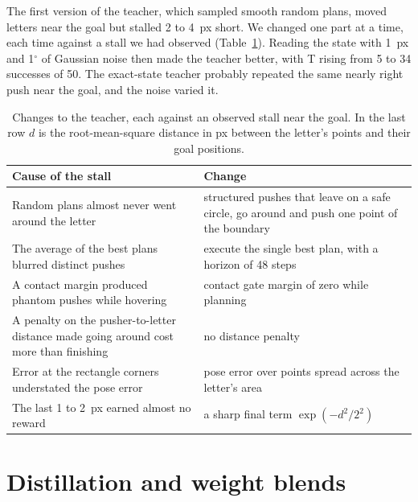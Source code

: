 \documentclass[10pt,twocolumn,letterpaper]{article}
\begin{document}
The first version of the teacher, which sampled smooth random plans, moved letters near the goal but stalled 2 to
4~px short. We changed one part at a time, each time against a stall we had observed (Table~\ref{tab:teacher}). Reading
the state with 1~px and 1$^\circ$ of Gaussian noise then made the teacher better, with T rising from 5 to 34 successes
of 50. The exact-state teacher probably repeated the same nearly right push near the goal, and the noise varied it.

\begin{table}[!htbp]
  \centering\small
  \caption{Changes to the teacher, each against an observed stall near the goal. In the last row $d$ is the
  root-mean-square distance in px between the letter's points and their goal positions.}
  \label{tab:teacher}
  \begin{tabular}{@{}>{\raggedright\arraybackslash}p{7.6cm}>{\raggedright\arraybackslash}p{8.4cm}@{}}
    \toprule
    Cause of the stall & Change \\
    \midrule
    Random plans almost never went around the letter & structured pushes that leave on a safe circle, go around and
      push one point of the boundary \\
    The average of the best plans blurred distinct pushes & execute the single best plan, with a horizon of 48 steps \\
    A contact margin produced phantom pushes while hovering & contact gate margin of zero while planning \\
    A penalty on the pusher-to-letter distance made going around cost more than finishing & no distance penalty \\
    Error at the rectangle corners understated the pose error & pose error over points spread across the letter's
      area \\
    The last 1 to 2~px earned almost no reward & a sharp final term $\exp(-d^2/2^2)$ \\
    \bottomrule
  \end{tabular}
\end{table}

\section{Distillation and weight blends}
\label{sec:app-blends}
\end{document}

